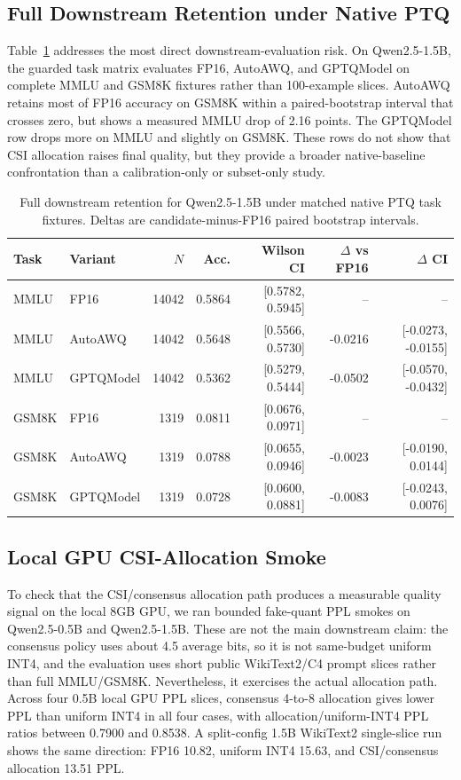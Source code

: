 \documentclass[letterpaper]{article}
\begin{document}
\subsection{Full Downstream Retention under Native PTQ}

Table~\ref{tab:full-retention} addresses the most direct downstream-evaluation
risk. On Qwen2.5-1.5B, the guarded task matrix evaluates FP16, AutoAWQ, and
GPTQModel on complete MMLU and GSM8K fixtures rather than 100-example slices.
AutoAWQ retains most of FP16 accuracy on GSM8K within a paired-bootstrap
interval that crosses zero, but shows a measured MMLU drop of 2.16 points. The
GPTQModel row drops more on MMLU and slightly on GSM8K. These rows do not show
that CSI allocation raises final quality, but they provide a broader
native-baseline confrontation than a calibration-only or subset-only study.

\begin{table}[t]
\centering
\small
\caption{Full downstream retention for Qwen2.5-1.5B under matched native PTQ
task fixtures. Deltas are candidate-minus-FP16 paired bootstrap intervals.}
\label{tab:full-retention}
\begin{tabular}{llrrrrr}
\toprule
Task & Variant & $N$ & Acc. & Wilson CI & $\Delta$ vs FP16 & $\Delta$ CI \\
\midrule
MMLU & FP16 & 14042 & 0.5864 & [0.5782, 0.5945] & -- & -- \\
MMLU & AutoAWQ & 14042 & 0.5648 & [0.5566, 0.5730] & -0.0216 & [-0.0273, -0.0155] \\
MMLU & GPTQModel & 14042 & 0.5362 & [0.5279, 0.5444] & -0.0502 & [-0.0570, -0.0432] \\
GSM8K & FP16 & 1319 & 0.0811 & [0.0676, 0.0971] & -- & -- \\
GSM8K & AutoAWQ & 1319 & 0.0788 & [0.0655, 0.0946] & -0.0023 & [-0.0190, 0.0144] \\
GSM8K & GPTQModel & 1319 & 0.0728 & [0.0600, 0.0881] & -0.0083 & [-0.0243, 0.0076] \\
\bottomrule
\end{tabular}
\end{table}

\subsection{Local GPU CSI-Allocation Smoke}

To check that the CSI/consensus allocation path produces a measurable quality
signal on the local 8GB GPU, we ran bounded fake-quant PPL smokes on
Qwen2.5-0.5B and Qwen2.5-1.5B. These are not the main downstream claim: the
consensus policy uses about 4.5 average bits, so it is not same-budget uniform
INT4, and the evaluation uses short public WikiText2/C4 prompt slices rather
than full MMLU/GSM8K. Nevertheless, it exercises the actual allocation path.
Across four 0.5B local GPU PPL slices, consensus 4-to-8 allocation gives lower
PPL than uniform INT4 in all four cases, with allocation/uniform-INT4 PPL ratios
between 0.7900 and 0.8538. A split-config 1.5B WikiText2 single-slice run shows
the same direction: FP16 10.82, uniform INT4 15.63, and CSI/consensus allocation
13.51 PPL.
\end{document}
